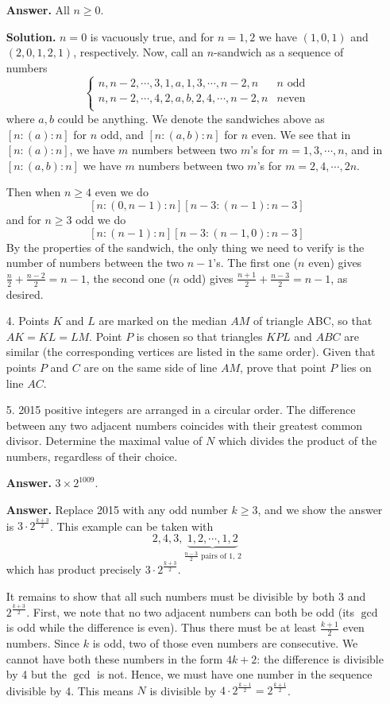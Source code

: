 \documentclass[11pt,a4paper]{article}
\begin{document}
\begin{enumerate}
	\textbf{Answer.} All $n\ge 0$. 
	
	\textbf{Solution.} $n=0$ is vacuously true, and for $n=1, 2$ we have $(1, 0, 1)$ and $(2, 0, 1, 2, 1)$, 
	respectively. 
	Now, call an $n$-sandwich as a sequence of numbers 
	\[
	\begin{cases}
	  n, n-2, \cdots,  3,1, a, 1, 3, \cdots, n-2, n  & n\text{ odd}\\
	  n, n-2, \cdots, 4, 2, a, b, 2, 4, \cdots, n-2, n & n\text{even}\\
	\end{cases}
	\]
	where $a, b$ could be anything. 
	We denote the sandwiches above as $[n:(a):n]$ for $n$ odd, and $[n:(a,b):n]$ for $n$ even. 
	We see that in $[n:(a):n]$, we have $m$ numbers between two $m$'s for $m=1, 3, \cdots, n$, 
	and in $[n:(a,b):n]$ we have $m$ numbers between two $m$'s for $m=2, 4, \cdots, 2n$. 
	
	Then when $n\ge 4$ even we do 
	\[
	[n:(0, n-1):n][n-3:(n-1):n-3]
	\]
	and for $n\ge 3$ odd we do 
	\[
	[n:(n-1):n][n-3:(n-1, 0):n-3]
	\]
	By the properties of the sandwich, the only thing we need to verify is the number of numbers between the 
	two $n-1$'s. 
	The first one ($n$ even) gives $\frac{n}{2}+\frac{n-2}{2}=n-1$, 
	the second one ($n$ odd) gives $\frac{n+1}{2}+\frac{n-3}{2}=n-1$, as desired. 
	
	\item[4.]Points $K$ and $L$ are marked on the median $AM$ of triangle ABC, so that
	$AK = KL = LM$. Point $P$ is chosen so that triangles $KPL$ and $ABC$ are
	similar (the corresponding vertices are listed in the same order). Given that
	points $P$ and $C$ are on the same side of line $AM$, prove that point $P$ lies on
	line $AC$.
	
	\item[5.]
	2015 positive integers are arranged in a circular order. The difference between
	any two adjacent numbers coincides with their greatest common divisor. 
	Determine the maximal value of $N$ which divides the product of the numbers,
	regardless of their choice.
	
	\textbf{Answer.} $3\times 2^{1009}$. 
	
	\textbf{Answer.} Replace 2015 with any odd number $k\ge 3$, and we show the answer is $3\cdot 2^{\frac{k+3}{2}}$. 
	This example can be taken with 
	\[2,4, 3, \underbrace{1,2,\cdots, 1,2}_{\frac{n-3}{2}\text{ pairs of 1, 2}}
	\]
	which has product precisely $3\cdot 2^{\frac{k+3}{2}}$. 
	
	It remains to show that all such numbers must be divisible by both 3 and $2^{\frac{k+3}{2}}$. 
	First, we note that no two adjacent numbers can both be odd (its $\gcd$ is odd while the difference is even). 
	Thus there must be at least $\frac{k+1}{2}$ even numbers. 
	Since $k$ is odd, two of those even numbers are consecutive. 
	We cannot have both these numbers in the form $4k+2$: the difference is divisible by 4 but the $\gcd$ is not. 
	Hence, we must have one number in the sequence divisible by 4. 
	This means $N$ is divisible by $4\cdot 2^{\frac{k-1}{2}}=2^{\frac{k+1}{2}}$. 
	

\end{enumerate}
\end{document}
